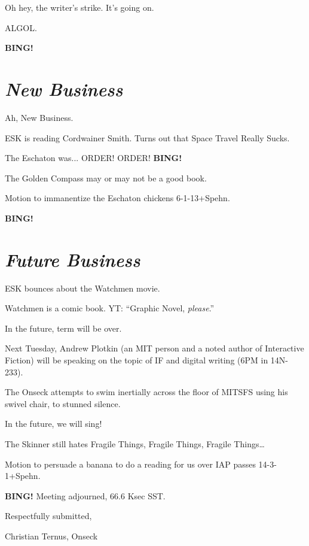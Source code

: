 \documentclass[10pt]{article}
\newcommand{\bing}{{\bf BING!} }
\newcommand{\goto}[1]{\bing \vskip 12pt \section*{{\em{#1}}}}
\begin{document}
Oh hey, the writer's strike.  It's going on.

ALGOL.

\goto{New Business}

Ah, New Business.

ESK is reading Cordwainer Smith.  Turns out that Space Travel Really Sucks.

The Eschaton was... ORDER!  ORDER! \bing

The Golden Compass may or may not be a good book.

Motion to immanentize the Eschaton chickens 6-1-13+Spehn.

\goto{Future Business}

ESK bounces about the Watchmen movie.

Watchmen is a comic book.  YT: ``Graphic Novel, \emph{please}.''

In the future, term will be over.

Next Tuesday, Andrew Plotkin (an MIT person and a noted author of Interactive Fiction) will be speaking on the topic of IF and digital writing (6PM in 14N-233).

The Onseck attempts to swim inertially across the floor of MITSFS using his swivel chair, to stunned silence.

In the future, we will sing!

The Skinner still hates Fragile Things, Fragile Things, Fragile Things\ldots{}

Motion to persuade a banana to do a reading for us over IAP passes 14-3-1+Spehn.

\bing
\noindent
Meeting adjourned, 66.6 Ksec SST.

\vspace{18pt}

\centerline{Respectfully submitted,}
\centerline{Christian Ternus, Onseck}
\end{document}
